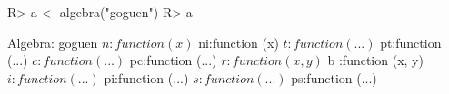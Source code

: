 \begin{Schunk}
% --begin: "goguen.algebra"
\begin{Sinput}
R> a <- algebra("goguen")
R> a
\end{Sinput}
\begin{Soutput}
Algebra: goguen 
 $ n :function (x)  
 $ ni:function (x)  
 $ t :function (...)  
 $ pt:function (...)  
 $ c :function (...)  
 $ pc:function (...)  
 $ r :function (x, y)  
 $ b :function (x, y)  
 $ i :function (...)  
 $ pi:function (...)  
 $ s :function (...)  
 $ ps:function (...)  
\end{Soutput}
%
% --end: "goguen.algebra"
\end{Schunk}
